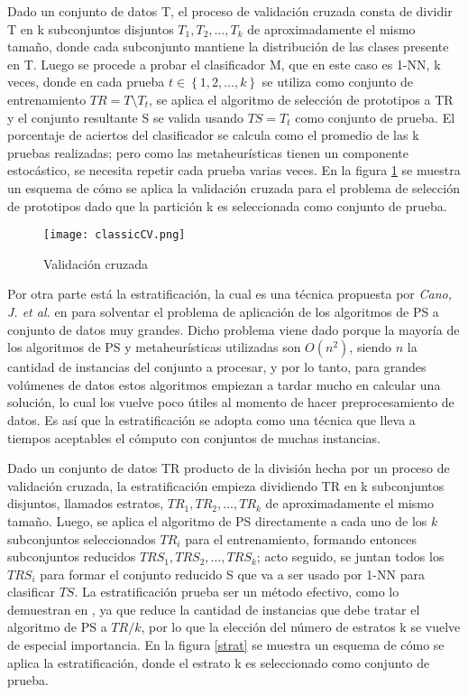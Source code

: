 Dado un conjunto de datos T, el proceso de validación cruzada \cite{kohavi1995study} consta de dividir T en k subconjuntos disjuntos $T_1,T_2,\dots,T_k$ de aproximadamente el mismo tamaño, donde cada subconjunto mantiene la distribución de las clases presente en T. Luego se procede a probar el clasificador M, que en este caso es 1-NN, k veces, donde en cada prueba $t \in \left\{1,2,\dots,k\right\}$ se utiliza como conjunto de entrenamiento $TR=T \setminus T_t$, se aplica el algoritmo de selección de prototipos a TR y el conjunto resultante S se valida usando $TS=T_t$ como conjunto de prueba. El porcentaje de aciertos del clasificador se calcula como el promedio de las k pruebas realizadas; pero como las metaheurísticas tienen un componente estocástico, se necesita repetir cada prueba varias veces.  En la figura \ref{crossval} se muestra un esquema de cómo se aplica la validación cruzada para el problema de selección de prototipos dado que la partición k es seleccionada como conjunto de prueba.

\begin{figure}[]
\centering
\texttt{[image: classicCV.png]}
\caption[Validación cruzada]{Validación cruzada}
\label{crossval}
\end{figure}

Por otra parte está la estratificación, la cual es una técnica propuesta por \emph{Cano, J. et al.} en \cite{cano2005stratification} para solventar el problema de aplicación de los algoritmos de PS a conjunto de datos muy grandes. Dicho problema viene dado porque la mayoría de los algoritmos de PS y metaheurísticas utilizadas son $O(n^2)$, siendo $n$ la cantidad de instancias del conjunto a procesar, y por lo tanto, para grandes volúmenes de datos estos algoritmos empiezan a tardar mucho en calcular una solución, lo cual los vuelve poco útiles al momento de hacer preprocesamiento de datos. Es así que la estratificación se adopta como una técnica que lleva a tiempos aceptables el cómputo con conjuntos de muchas instancias. 

Dado un conjunto de datos TR producto de la división hecha por un proceso de validación cruzada, la estratificación empieza dividiendo TR en k subconjuntos disjuntos, llamados estratos, $TR_1,TR_2,\dots,TR_k$ de aproximadamente el mismo tamaño. Luego, se aplica el algoritmo de PS directamente a cada uno de los $k$ subconjuntos seleccionados $TR_i$ para el entrenamiento, formando entonces subconjuntos reducidos $TRS_1,TRS_2,\dots,TRS_k$; acto seguido, se juntan todos los $TRS_i$ para formar el conjunto reducido S que va a ser usado por 1-NN para clasificar $TS$. La estratificación prueba ser un método efectivo, como lo demuestran en \cite{cano2005stratification}, ya que reduce la cantidad de instancias que debe tratar el algoritmo de PS a $TR/k$, por lo que la elección del número de estratos k se vuelve de especial importancia. En la figura \ref{strat} se muestra un esquema de cómo se aplica la estratificación, donde el estrato k es seleccionado como conjunto de prueba.

